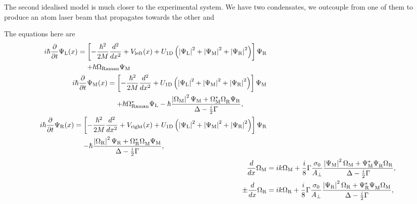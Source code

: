 The second idealised model is much closer to the experimental system.  We have two condensates, we outcouple from one of them to produce an atom laser beam that propagates towards the other and 


The equations here are
\begin{subequations}
    \label{OpticalPumping:TravellingBeamEvolution}
    \begin{align}
        \begin{split}
            i \hbar \frac{\partial}{\partial t} \Psi_\text{L}(x) &= \left[ - \frac{\hbar^2}{2M} \frac{d^2}{dx^2} + V_\text{left}(x) + U_\text{1D}\left(\abs{\Psi_\text{L}}^2 + \abs{\Psi_\text{M}}^2 + \abs{\Psi_\text{R}}^2\right) \right] \Psi_\text{R}\\
            &\relphantom{=} +\hbar \Omega_\text{Raman} \Psi_\text{M}
        \end{split}\\
        \begin{split}
            i \hbar \frac{\partial}{\partial t} \Psi_\text{M}(x) &= \left[- \frac{\hbar^2}{2M}\frac{d^2}{dx^2} + U_\text{1D}\left(\abs{\Psi_\text{L}}^2 + \abs{\Psi_\text{M}}^2 + \abs{\Psi_\text{R}}^2\right)  \right] \Psi_\text{M}\\
            &\relphantom{=} + \hbar \Omega^*_\text{Raman} \Psi_\text{L} - \hbar \frac{\abs{\Omega_\text{M}}^2\Psi_\text{M} + \Omega_\text{M}^* \Omega_\text{R}^{\phantom{*}}\Psi_\text{R}}{\Delta - \frac{i}{2} \Gamma},
        \end{split} \label{OpticalPumping:TravellingBeamEvolution:CondensatesEvolution:PsiM}\\
        \begin{split}
            i \hbar \frac{\partial}{\partial t} \Psi_\text{R}(x) &= \left[- \frac{\hbar^2}{2M}\frac{d^2}{dx^2} + V_\text{right}(x) + U_\text{1D}\left(\abs{\Psi_\text{L}}^2 + \abs{\Psi_\text{M}}^2 + \abs{\Psi_\text{R}}^2\right)  \right] \Psi_\text{R}\\
            &\relphantom{=} - \hbar \frac{\abs{\Omega_\text{R}}^2 \Psi_\text{R} + \Omega_\text{R}^* \Omega_\text{M}^{\phantom{*}} \Psi_\text{M}}{\Delta - \frac{i}{2} \Gamma},
        \end{split} \label{OpticalPumping:OverlappingCondensatesEvolution:PsiR}\\
        \frac{d}{dx} \Omega_\text{M} &= i k \Omega_\text{M} + \frac{i}{8} \Gamma \frac{\sigma_0}{A_\perp} \frac{\abs{\Psi_\text{M}}^2 \Omega_\text{M} + \Psi_\text{M}^* \Psi_\text{R}^{\phantom{*}}\Omega_\text{R}}{\Delta - \frac{i}{2} \Gamma}, \label{OpticalPumping:OverlappingCondensatesEvolution:OmegaM}\\
        \pm \frac{d}{dx} \Omega_\text{R} &= i k \Omega_\text{R} + \frac{i}{8} \Gamma \frac{\sigma_0}{A_\perp} \frac{\abs{\Psi_\text{R}}^2 \Omega_\text{R} + \Psi_\text{R}^* \Psi_\text{M}^{\phantom{*}} \Omega_\text{M}}{\Delta - \frac{i}{2} \Gamma}, \label{OpticalPumping:OverlappingCondensatesEvolution:OmegaR}
    \end{align}
\end{subequations}


